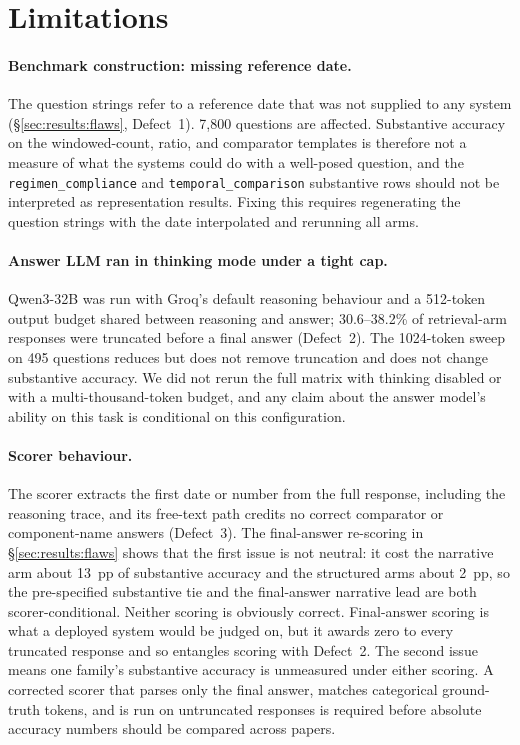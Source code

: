 
\section{Limitations}
\label{sec:limitations}

\paragraph{Benchmark construction: missing reference date.}
The question strings refer to a reference date that was not supplied to any system
(\S\ref{sec:results:flaws}, Defect~1).  7,800 questions are affected.  Substantive
accuracy on the windowed-count, ratio, and comparator templates is therefore not a
measure of what the systems could do with a well-posed question, and the
\texttt{regimen\_compliance} and \texttt{temporal\_comparison} substantive rows should
not be interpreted as representation results.  Fixing this requires regenerating the
question strings with the date interpolated and rerunning all arms.

\paragraph{Answer LLM ran in thinking mode under a tight cap.}
Qwen3-32B was run with Groq's default reasoning behaviour and a 512-token output budget
shared between reasoning and answer; 30.6--38.2\% of retrieval-arm responses were
truncated before a final answer (Defect~2).  The 1024-token sweep on 495 questions reduces
but does not remove truncation and does not change substantive accuracy.  We did not rerun
the full matrix with thinking disabled or with a multi-thousand-token budget, and any
claim about the answer model's ability on this task is conditional on this configuration.

\paragraph{Scorer behaviour.}
The scorer extracts the first date or number from the full response, including the
reasoning trace, and its free-text path credits no correct comparator or component-name
answers (Defect~3).  The final-answer re-scoring in \S\ref{sec:results:flaws} shows that
the first issue is not neutral: it cost the narrative arm about 13~pp of substantive
accuracy and the structured arms about 2~pp, so the pre-specified substantive tie and
the final-answer narrative lead are both scorer-conditional.  Neither scoring is
obviously correct.  Final-answer scoring is what a deployed system would be judged on, but
it awards zero to every truncated response and so entangles scoring with Defect~2.  The
second issue means one family's substantive accuracy is unmeasured under either scoring.
A corrected scorer that parses only the final answer, matches categorical ground-truth
tokens, and is run on untruncated responses is required before absolute accuracy numbers
should be compared across papers.

